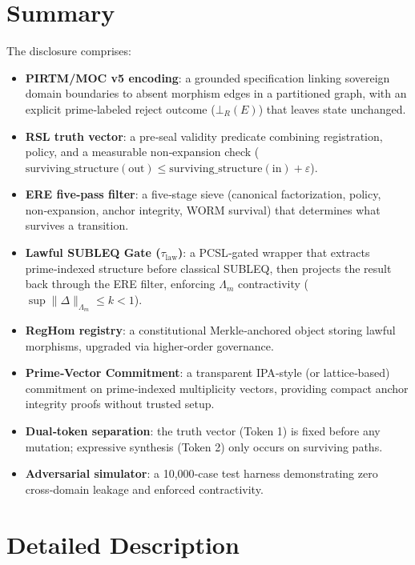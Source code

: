 \documentclass[11pt,a4paper]{article}
\theoremstyle{definition}
\theoremstyle{remark}
\begin{document}
\section{Summary}
\label{sec:summary}
The disclosure comprises:
\begin{itemize}[noitemsep]
    \item \textbf{PIRTM/MOC v5 encoding}: a grounded specification linking sovereign domain boundaries to absent morphism edges in a partitioned graph, with an explicit prime‑labeled reject outcome ($\bot_R(E)$) that leaves state unchanged.
    \item \textbf{RSL truth vector}: a pre‑seal validity predicate combining registration, policy, and a measurable non‑expansion check ($\text{surviving\_structure}(\text{out}) \leq \text{surviving\_structure}(\text{in}) + \varepsilon$).
    \item \textbf{ERE five‑pass filter}: a five‑stage sieve (canonical factorization, policy, non‑expansion, anchor integrity, WORM survival) that determines what survives a transition.
    \item \textbf{Lawful SUBLEQ Gate ($\tau_\text{law}$)}: a PCSL‑gated wrapper that extracts prime‑indexed structure before classical SUBLEQ, then projects the result back through the ERE filter, enforcing $\Lambda_m$ contractivity ($\sup \|\Delta\|_{\Lambda_m} \le k < 1$).
    \item \textbf{RegHom registry}: a constitutional Merkle‑anchored object storing lawful morphisms, upgraded via higher‑order governance.
    \item \textbf{Prime‑Vector Commitment}: a transparent IPA‑style (or lattice‑based) commitment on prime‑indexed multiplicity vectors, providing compact anchor integrity proofs without trusted setup.
    \item \textbf{Dual‑token separation}: the truth vector (Token 1) is fixed before any mutation; expressive synthesis (Token 2) only occurs on surviving paths.
    \item \textbf{Adversarial simulator}: a 10,000‑case test harness demonstrating zero cross‑domain leakage and enforced contractivity.
\end{itemize}

\section{Detailed Description}
\label{sec:detailed}
\end{document}
